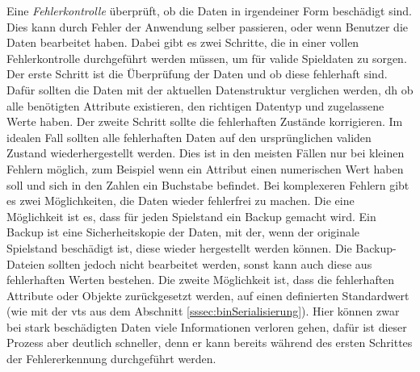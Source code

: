 Eine \textit{Fehlerkontrolle} überprüft, ob die Daten in irgendeiner Form beschädigt sind. Dies kann durch Fehler der Anwendung selber passieren, oder wenn Benutzer die Daten bearbeitet haben. Dabei gibt es zwei Schritte, die in einer vollen Fehlerkontrolle durchgeführt werden müssen, um für valide Spieldaten zu sorgen. Der erste Schritt ist die Überprüfung der Daten und ob diese fehlerhaft sind. Dafür sollten die Daten mit der aktuellen Datenstruktur verglichen werden, \ac{dh} ob alle benötigten Attribute existieren, den richtigen Datentyp und zugelassene Werte haben. Der zweite Schritt sollte die fehlerhaften Zustände korrigieren. Im idealen Fall sollten alle fehlerhaften Daten auf den ursprünglichen validen Zustand wiederhergestellt werden. Dies ist in den meisten Fällen nur bei kleinen Fehlern möglich, zum Beispiel wenn ein Attribut einen numerischen Wert haben soll und sich in den Zahlen ein Buchstabe befindet. Bei komplexeren Fehlern gibt es zwei Möglichkeiten, die Daten wieder fehlerfrei zu machen. Die eine Möglichkeit ist es, dass für jeden Spielstand ein Backup gemacht wird. Ein Backup ist eine Sicherheitskopie der Daten, mit der, wenn der originale Spielstand beschädigt ist, diese wieder hergestellt werden können.\cite{ibmDevelopingBackup} Die Backup-Dateien sollten jedoch nicht bearbeitet werden, sonst kann auch diese aus fehlerhaften Werten bestehen. Die zweite Möglichkeit ist, dass die fehlerhaften Attribute oder Objekte zurückgesetzt werden, auf einen definierten Standardwert (wie mit der \ac{vts} aus dem Abschnitt \ref{sssec:binSerialisierung}). Hier können zwar bei stark beschädigten Daten viele Informationen verloren gehen, dafür ist dieser Prozess aber deutlich schneller, denn er kann bereits während des ersten Schrittes der Fehlererkennung durchgeführt werden.





